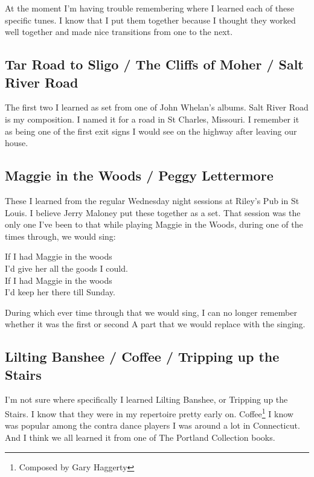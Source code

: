 \documentclass[9pt,letterpaper]{article}
\begin{document}
{At the moment I'm having trouble remembering where I learned each of these specific tunes. I know that I put them together because I thought they worked well together and made nice transitions from one to the next.

\subsection{Tar Road to Sligo / The Cliffs of Moher / Salt River Road}

The first two I learned as set from one of John Whelan's albums. Salt River Road is my composition. I named it for a road in St Charles, Missouri. I remember it as being one of the first exit signs I would see on the highway after leaving our house.

\subsection{Maggie in the Woods / Peggy Lettermore}

These I learned from the regular Wednesday night sessions at Riley's Pub in St Louis. I believe Jerry Maloney put these together as a set. That session was the only one I've been to that while playing Maggie in the Woods, during one of the times through, we would sing:

\hfill

\noindent If I had Maggie in the woods \\
I'd give her all the goods I could. \\
If I had Maggie in the woods \\
I'd keep her there till Sunday.

\hfill

During which ever time through that we would sing, I can no longer remember whether it was the first or second A part that we would replace with the singing.

\subsection{Lilting Banshee / Coffee / Tripping up the Stairs}

I'm not sure where specifically I learned Lilting Banshee, or Tripping up the Stairs. I know that they were in my repertoire pretty early on. Coffee\footnote{Composed by Gary Haggerty} I know was popular among the contra dance players I was around a lot in Connecticut. And I think we all learned it from one of The Portland Collection books.

}
\end{document}
